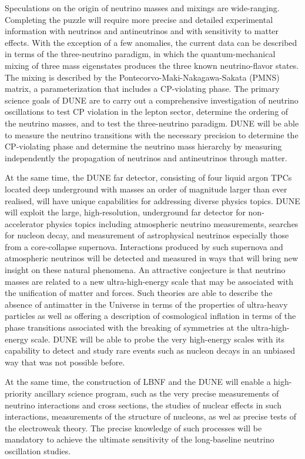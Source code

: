 Speculations on the origin of neutrino masses and mixings are wide-ranging. 
Completing the puzzle will require more precise and detailed experimental information with neutrinos and antineutrinos and with sensitivity to matter effects. With the exception of a few anomalies, the current data can be described in terms of the three-neutrino paradigm, in which the quantum-mechanical mixing of three mass eigenstates produces the three known neutrino-flavor states.  The mixing is described by the Pontecorvo-Maki-Nakagawa-Sakata (PMNS) matrix, a parameterization that includes a CP-violating phase. 
The primary science goals of DUNE are to carry out a comprehensive investigation of neutrino oscillations to test CP violation in the lepton sector, determine the ordering of the neutrino masses, and to test the three-neutrino paradigm.
DUNE will be able to measure the neutrino transitions with the necessary precision to determine the CP-violating phase and determine the neutrino mass hierarchy by measuring independently the  propagation of neutrinos and antineutrinos through matter.

At the same time, the DUNE far detector, consisting of four liquid argon TPCs located deep underground with masses an order of magnitude larger than ever realised, will have unique capabilities for addressing diverse physics topics. 
DUNE will exploit the large, high-resolution, underground far detector for non-accelerator physics topics including atmospheric neutrino measurements, searches for nucleon decay, and measurement of astrophysical neutrinos especially those from a core-collapse supernova.
Interactions produced by such supernova and atmospheric neutrinos will be detected and measured in ways that will bring new insight on these natural phenomena. 
An attractive conjecture is that neutrino masses are related to a new ultra-high-energy scale that may be associated with the unification of matter and forces. Such theories are able to describe the absence of antimatter in the Universe in terms of the properties of ultra-heavy particles as well as offering a description of cosmological inflation in terms of the phase transitions associated with the breaking of symmetries at the ultra-high-energy scale. DUNE will be able to probe the very high-energy scales with its capability to detect and study rare events such as nucleon decays in an unbiased way that was not possible before. 

At the same time, the construction of LBNF and the DUNE will enable a high-priority ancillary science program, such as 
the very precise measurements of neutrino interactions and cross sections, the studies of nuclear effects in such interactions, measurements of the structure of nucleons, as wel as precise tests of the electroweak theory. The precise knowledge of such processes will be mandatory to achieve the ultimate sensitivity of the long-baseline neutrino oscillation studies.

